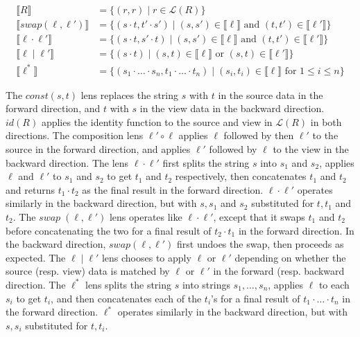 \documentclass{svproc}
\newcommand{\sep}{\ensuremath{\; | \;}}
\begin{document}
\begin{align*}
  \llbracket R \rrbracket &= \{(r, r) \sep r \in \mathcal{L}(R)\}\\
  \llbracket swap(\ell, \ell') \rrbracket &= \{(s \cdot t, t' \cdot s') \sep
                                            (s, s') \in \llbracket \ell \rrbracket \text{ and } (t, t') \in \llbracket
                                            \ell' \rrbracket\}\\
  \llbracket \ell \cdot \ell' \rrbracket &= \{(s \cdot t, s' \cdot t) \sep
                                           (s, s') \in \llbracket \ell \rrbracket \text{ and } (t, t') \in \llbracket
                                           \ell' \rrbracket\}\\
  \llbracket \ell \sep \ell' \rrbracket &= \{(s \cdot t) \sep
                                          (s, t) \in \llbracket \ell \rrbracket \text{ or } (s, t) \in \llbracket
                                          \ell' \rrbracket\}\\
  \llbracket \ell^* \rrbracket &= \{(s_1 \cdot \ldots \cdot s_n, t_1 \cdot \ldots
                                 \cdot t_n) \sep (s_i, t_i) \in \llbracket \ell \rrbracket \text{ for } 1
                                 \leq i \leq n\}
\end{align*}

The $\mathit{const}(s, t)$ lens replaces the string $s$ with $t$ in the source
data in the forward direction, and $t$ with $s$ in the view data in the backward
direction. $\mathit{id}(R)$ applies the identity function to the source and view
in $\mathcal{L}(R)$ in both directions. The composition lens $\ell' \circ \ell$
applies $\ell$ followed by then $\ell'$ to the source in the forward direction,
and applies $\ell'$ followed by $\ell$ to the view in the backward direction.
The lens $\ell \cdot \ell'$ first splits the string $s$ into $s_1$ and $s_2$,
applies $\ell$ and $\ell'$ to $s_1$ and $s_2$ to get $t_1$ and $t_2$
respectively, then concatenates $t_1$ and $t_2$ and returns $t_1 \cdot t_2$ as
the final result in the forward direction. $\ell \cdot \ell'$ operates
similarly in the backward direction, but with $s, s_1$ and $s_2$ substituted
for $t, t_1$ and $t_2$. The $\mathit{swap} \; (\ell, \ell')$ lens operates
like $\ell \cdot \ell'$, except that it swaps $t_1$ and $t_2$ before
concatenating the two for a final result of $t_2 \cdot t_1$ in the forward
direction. In the backward direction, $\mathit{swap}(\ell, \ell')$ first undoes
the swap, then proceeds as expected. The $\ell \; | \; \ell'$ lens
chooses to apply $\ell$ or $\ell'$ depending on whether the source
(resp. view) data is matched by $\ell$ or $\ell'$ in the forward (resp.
backward direction. The $\ell^*$ lens splits the string $s$ into strings $s_1,
\ldots, s_n$, applies $\ell$ to each $s_i$ to get $t_i$, and then concatenates
each of the $t_i$'s for a final result of $t_1 \cdot \ldots \cdot t_n$ in the
forward direction. $\ell^*$ operates similarly in the backward direction, but
with $s, s_i$ substituted for $t, t_i$.
\end{document}
